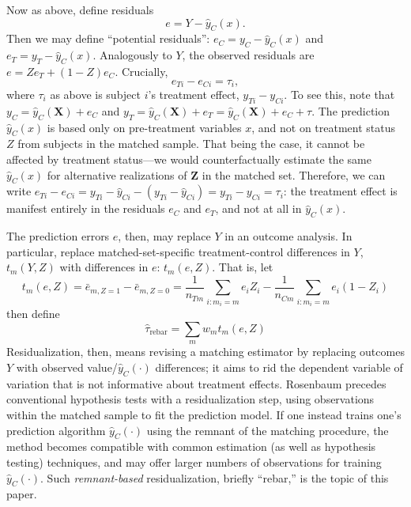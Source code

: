 \documentclass[12pt]{article}\usepackage[]{graphicx}\usepackage[]{color}
\newcommand{\est}{\hat{\tau}_{\text{rebar}}}
\newcommand{\yci}{y_{Ci}}
\newcommand{\yti}{y_{Ti}}
\newcommand{\yhat}{\hat{y}_C}
\newcommand{\match}{m}
\newcommand{\algorithm}{\hat{y}_C(\cdot)}
\newcommand{\covMat}{\bm{X}}
\newcommand{\covVec}{x}
\begin{document}
Now as above, define residuals
\begin{equation*}
e=Y-\yhat (\covVec).
\end{equation*}
Then we may define ``potential residuals'': $e_C=y_C-\yhat (\covVec)$ and $e_T=y_T-\yhat (\covVec)$.
Analogously to $Y$, the observed residuals are $e=Ze_T+(1-Z)e_C$.
Crucially,
\begin{equation}\label{eq:eDiff}
e_{Ti}-e_{Ci}=\tau_i ,
\end{equation}
where $\tau_i$ as above is subject $i$'s treatment effect, $\yti-\yci$.
To see this, note that $y_C=\hat{y}_C(\covMat)+e_C$ and $y_T=\hat{y}_C(\covMat)+e_T=\hat{y}_C(\covMat)+e_C+\tau$.
The prediction $\yhat (\covVec)$ is based only on pre-treatment variables
$\covVec$, and not on treatment status $Z$ from subjects in the matched sample.
That being the case, it cannot be affected by treatment status---we would counterfactually estimate the same $\yhat (\covVec)$ for alternative realizations of $\bm{Z}$ in the matched set.
Therefore, we can write $e_{Ti}-e_{Ci}=y_{Ti}-\hat{y}_{Ci}-(y_{Ti}-\hat{y}_{Ci})=y_{Ti}-y_{Ci}=\tau_i$: the treatment effect is manifest entirely in the residuals $e_C$ and $e_T$, and not at all in $\yhat (\covVec)$.

The prediction errors $e$, then, may replace $Y$ in an outcome analysis.
In particular, replace matched-set-specific treatment-control differences in $Y$, $t_m(Y,Z)$ with differences in $e$: $t_m(e,Z)$.
That is, let
\begin{equation*}
t_m(e,Z)=\bar{e}_{m, Z=1}-\bar{e}_{m, Z=0}=\frac{1}{n_{Tm}}\sum_{i:\match_i=m} e_i Z_i -\frac{1}{n_{Cm}}\sum_{i:\match_i=m} e_i (1-Z_i)
\end{equation*}
then define
\begin{equation}\label{estimator}
\est=\sum_m w_m t_m(e,Z)
\end{equation}
Residualization, then, means revising a
matching estimator by replacing outcomes $Y$ with observed value/$\algorithm$ differences; it aims to rid the
dependent variable of variation that is not informative about
treatment effects.
Rosenbaum \citeyearpar{rosenbaum2002covariance} precedes conventional hypothesis tests
with a residualization step, using observations within the matched sample
to fit the prediction model. If one instead trains one's
prediction algorithm $\algorithm$ using the remnant of the matching
procedure, the method becomes compatible with common estimation
(as well as hypothesis testing) techniques, and may offer larger
numbers of observations for training $\algorithm$.
Such \textit{remnant-based} residualization, briefly ``rebar,'' is the
topic of this paper.
\end{document}
